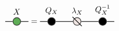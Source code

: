 
\renewcommand{\graphTensorSpacing}{1.1}
\renewcommand{\graphTensorTwoStart}{2.25*\graphTensorSpacing}
\[
\begin{tikzpicture}[baseline=-0.65ex]
	\node[circle,draw=black!80,thick,fill=myGreen,label=above:$X$] (X) at (0,0) {};
	\draw[thick, draw=black] (-\graphLineSpacing,0) -- (X) -- (\graphLineSpacing,0) {};
\end{tikzpicture}
=
\begin{tikzpicture}[baseline=-0.65ex]
	\node[circle,draw=black!80,thick,fill=black,label=above:$Q_X$] (Q) at (0,0) {};
	\node[circle,draw=black!80,thick,fill=myGrey,label=above:$\lambda_X$] (LAMBDA) at (\graphTensorSpacing,0) {};
	\draw[thick] (\graphTensorSpacing - 0.2,0 + 0.2) -- (\graphTensorSpacing + 0.2,0 - 0.2) {};
	\node[circle,draw=black!80,thick,fill=black,label=above:$Q_X^{-1}$] (Q1) at (2*\graphTensorSpacing,0) {};

	\draw[thick, draw=black] (-\graphLineSpacing,0) -- (Q) -- (LAMBDA) -- (Q1) -- (2*\graphTensorSpacing + \graphLineSpacing,0) {};

\end{tikzpicture}
\]